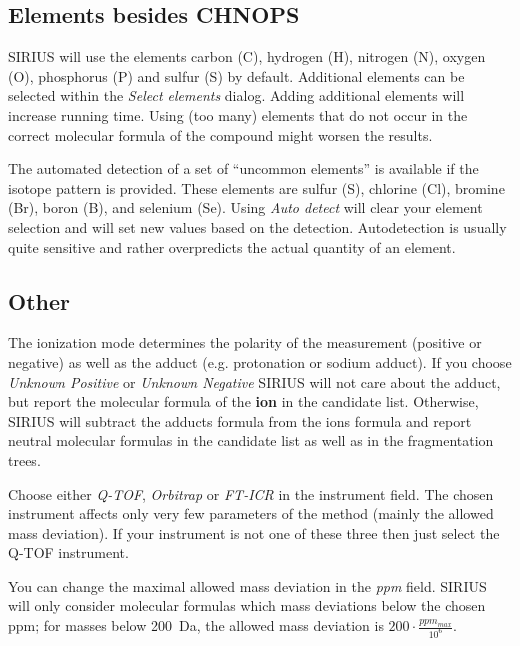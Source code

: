 \documentclass[letterpaper,10pt,openany,oneside]{sphinxmanual}
\newcommand\gui[1]{\textsl{\guilsinglleft#1\guilsinglright\xspace}}
\begin{document}
\subsection{Elements besides CHNOPS}
\label{gui:elements-besides-chnops}
SIRIUS will use the elements carbon (C), hydrogen (H), nitrogen (N), oxygen (O), phosphorus (P) and sulfur (S) by default. Additional elements can be selected within the \gui{Select elements} dialog. 
Adding additional elements will increase running time. Using (too many) elements that do not occur in the correct molecular formula of the compound might worsen the results.

The automated detection of a set of ``uncommon elements'' is available if the 
isotope pattern is provided. These elements are sulfur (S), chlorine (Cl), 
bromine (Br), boron (B), and selenium (Se). 
Using \gui{Auto detect} will clear your element selection and will set new values based on the detection. Autodetection is usually quite sensitive and rather overpredicts the actual quantity of an element.

\subsection{Other}
\label{gui:other}

The ionization mode determines the polarity of the measurement (positive or negative) as well as the adduct (e.g. protonation or sodium adduct). If you choose \gui{Unknown Positive} or \gui{Unknown Negative} SIRIUS will not care about the adduct, but report the molecular formula of the \textbf{ion} in the candidate list. Otherwise, SIRIUS will subtract the adducts formula from the ions formula and report neutral molecular formulas in the candidate list as well as in the fragmentation trees.

Choose either \gui{Q-TOF}, \gui{Orbitrap} or \gui{FT-ICR} in the instrument field. The chosen instrument affects only very few parameters of the method (mainly the allowed mass deviation). If your instrument is not one of these three then just select the Q-TOF instrument.

You can change the maximal allowed mass deviation in the \gui{ppm}
field. SIRIUS will only consider molecular formulas which mass deviations
below the chosen ppm; for masses below 200~Da, the allowed mass deviation
is \(200 \cdot \frac{ppm_{max}}{10^6}\).
\end{document}
